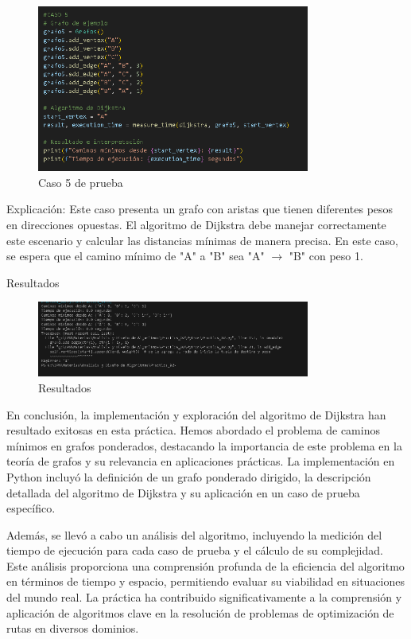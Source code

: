 \documentclass{article}
\begin{document}
\begin{figure}[H]
    \centering
    \includegraphics[width=0.8\textwidth]{figura_8_caso_5.PNG}
    \caption{Caso 5 de prueba}
    \label{figura 8}
\end{figure}
Explicación: Este caso presenta un grafo con aristas que tienen diferentes 
pesos en direcciones opuestas. El algoritmo de Dijkstra debe manejar 
correctamente este escenario y calcular las distancias mínimas de manera 
precisa. En este caso, se espera que el camino mínimo de "A" a "B" sea "A" $\to$ "B" con peso 1.

Resultados
\begin{figure}[H]
    \centering
    \includegraphics[width=0.8\textwidth]{resultados.PNG}
    \caption{Resultados}
    \label{figura 9}
\end{figure}

En conclusión, la implementación y exploración del algoritmo de Dijkstra 
han resultado exitosas en esta práctica. Hemos abordado el problema de 
caminos mínimos en grafos ponderados, destacando la importancia de este 
problema en la teoría de grafos y su relevancia en aplicaciones prácticas. 
La implementación en Python incluyó la definición de un grafo ponderado 
dirigido, la descripción detallada del algoritmo de Dijkstra y su aplicación 
en un caso de prueba específico.

Además, se llevó a cabo un análisis del algoritmo, incluyendo la medición del 
tiempo de ejecución para cada caso de prueba y el cálculo de su complejidad. 
Este análisis proporciona una comprensión profunda de la eficiencia del 
algoritmo en términos de tiempo y espacio, permitiendo evaluar su viabilidad 
en situaciones del mundo real. La práctica ha contribuido significativamente 
a la comprensión y aplicación de algoritmos clave en la resolución de 
problemas de optimización de rutas en diversos dominios.
\end{document}
